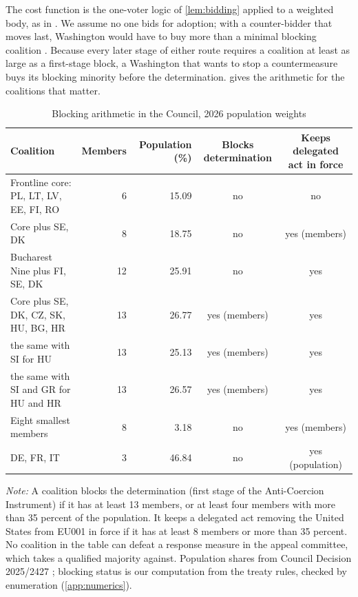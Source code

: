 The cost function is the one-voter logic of \cref{lem:bidding} applied to a weighted body, as in \citet{groseclose1996buying}. We assume no one bids for adoption; with a counter-bidder that moves last, Washington would have to buy more than a minimal blocking coalition \citep{groseclose1996buying, banks2000buying}. Because every later stage of either route requires a coalition at least as large as a first-stage block, a Washington that wants to stop a countermeasure buys its blocking minority before the determination.  gives the arithmetic for the coalitions that matter.

\begin{table}[t]
\centering
\small
\caption{Blocking arithmetic in the Council, 2026 population weights}\label{tab:council}
\begin{tabularx}{\textwidth}{@{}>{\raggedright\arraybackslash}Xrrcc@{}}
\toprule
Coalition & Members & Population (\%) & Blocks determination & Keeps delegated act in force\\
\midrule
Frontline core: PL, LT, LV, EE, FI, RO & 6 & 15.09 & no & no\\
Core plus SE, DK & 8 & 18.75 & no & yes (members)\\
Bucharest Nine plus FI, SE, DK & 12 & 25.91 & no & yes\\
Core plus SE, DK, CZ, SK, HU, BG, HR & 13 & 26.77 & yes (members) & yes\\
\quad the same with SI for HU & 13 & 25.13 & yes (members) & yes\\
\quad the same with SI and GR for HU and HR & 13 & 26.57 & yes (members) & yes\\
Eight smallest members & 8 & 3.18 & no & yes (members)\\
DE, FR, IT & 3 & 46.84 & no & yes (population)\\
\bottomrule
\end{tabularx}
\begin{minipage}{\textwidth}\footnotesize\vspace{4pt}
\emph{Note:} A coalition blocks the determination (first stage of the Anti-Coercion Instrument) if it has at least 13 members, or at least four members with more than 35 percent of the population. It keeps a delegated act removing the United States from EU001 in force if it has at least 8 members or more than 35 percent. No coalition in the table can defeat a response measure in the appeal committee, which takes a qualified majority against. Population shares from Council Decision 2025/2427 \citep{council2025population}; blocking status is our computation from the treaty rules, checked by enumeration (\cref{app:numerics}).
\end{minipage}
\end{table}

